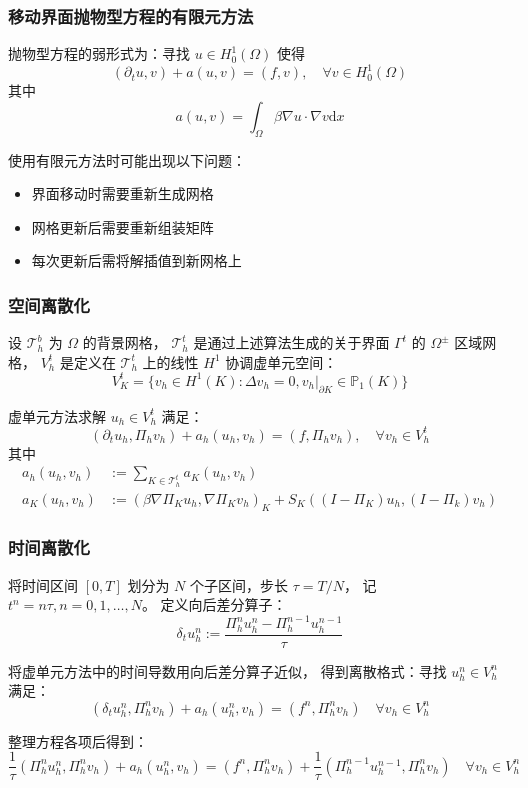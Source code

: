 \documentclass[notheorems,serif]{beamer}
\begin{document}
\begin{frame}
\frametitle{移动界面抛物型方程的有限元方法}

抛物型方程的弱形式为：寻找 $u \in H^1_0(\Omega)$ 使得
$$
(\partial_t u, v) + a(u, v) = (f, v), \quad \forall v \in H^1_0(\Omega)
$$
其中
$$
a(u, v) = \int_{\Omega} \beta \nabla u \cdot \nabla v \mathrm{d}x 
$$

使用有限元方法时可能出现以下问题：
\begin{itemize}
    \item 界面移动时需要重新生成网格
    \item 网格更新后需要重新组装矩阵
    \item 每次更新后需将解插值到新网格上
\end{itemize}
\end{frame}

\begin{frame}
    \frametitle{空间离散化}
设 $\mathcal{T}_h^b$ 为 $\Omega$ 的背景网格，
$\mathcal{T}_h^t$ 是通过上述算法生成的关于界面 $\Gamma^t$ 的 $\Omega^{\pm}$ 区域网格，
$V_h^t$ 是定义在 $\mathcal{T}_h^t$ 上的线性 $H^1$ 协调虚单元空间：
$$
V_K^t = \{v_h \in H^1(K): \Delta v_h = 0, v_h|_{\partial K} \in
    \mathbb{P}_1(K)\}
$$

虚单元方法求解 $u_h \in V_h^t$ 满足：
$$
(\partial_t u_h, \Pi_hv_h) + a_h(u_h, v_h) = 
(f, \Pi_hv_h), \quad \forall
v_h \in V_h^t
$$
其中
$$
\begin{aligned}
    a_h(u_h, v_h) & := \sum_{K\in \mathcal{T}_h^t} a_K(u_h, v_h)\\
    a_K(u_h, v_h) & := (\beta\nabla \Pi_K u_h, \nabla \Pi_K v_h)_{K}
+ S_K( (I-\Pi_K) u_h, (I-\Pi_k)v_h)
\end{aligned}
$$
\end{frame}

\begin{frame}
    \frametitle{时间离散化}
将时间区间 $[0, T]$ 划分为 $N$ 个子区间，步长 $\tau = T/N$，
记 $t^n = n\tau, n = 0, 1, \dots, N$。
定义向后差分算子：
$$
\delta_t u_h^n := \frac{\Pi_h^{n}u_h^n - \Pi_h^{n-1} u_h^{n-1}}{\tau}
$$

将虚单元方法中的时间导数用向后差分算子近似，
得到离散格式：寻找 $u_h^n \in V_h^n$ 满足：
$$
(\delta_t u_h^n, \Pi_h^n v_h) + a_h(u_h^n, v_h) = (f^n,\Pi_h^n v_h)
\quad \forall v_h \in V_h^n
$$

整理方程各项后得到：
$$
\frac{1}{\tau}( \Pi_h^n u_h^n,\Pi_h^n v_h) + a_h(u_h^n, v_h) = 
(f^n, \Pi_h^n v_h) + \frac{1}{\tau}(\Pi_h^{n-1} u_h^{n-1},\Pi_h^n v_h)
\quad \forall v_h \in V_h^n
$$
\end{frame}
\end{document}

